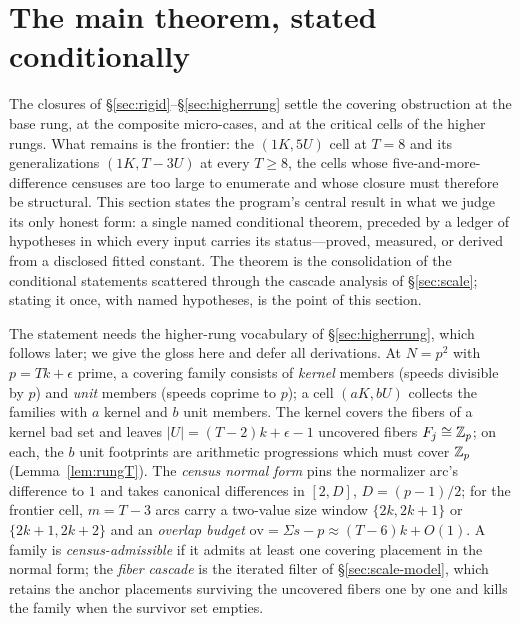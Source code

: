 
\section{The main theorem, stated conditionally}\label{sec:SC}

The closures of \S\ref{sec:rigid}--\S\ref{sec:higherrung} settle the
covering obstruction at the base rung, at the composite micro-cases, and
at the critical cells of the higher rungs. What remains is the frontier:
the $(1K,5U)$ cell at $T=8$ and its generalizations $(1K,T{-}3U)$ at
every $T\ge 8$, the cells whose five-and-more-difference censuses are too
large to enumerate and whose closure must therefore be structural. This
section states the program's central result in what we judge its only
honest form: a single named conditional theorem, preceded by a ledger of
hypotheses in which every input carries its status---proved, measured,
or derived from a disclosed fitted constant. The theorem is the
consolidation of the conditional statements scattered through the
cascade analysis of \S\ref{sec:scale}; stating it once, with named
hypotheses, is the point of this section.

The statement needs the higher-rung vocabulary of
\S\ref{sec:higherrung}, which follows later; we give the gloss here and
defer all derivations. At $N=p^2$ with $p=Tk+\epsilon$ prime, a covering
family consists of \emph{kernel} members (speeds divisible by $p$) and
\emph{unit} members (speeds coprime to $p$); a cell $(aK,bU)$ collects
the families with $a$ kernel and $b$ unit members. The kernel covers the
fibers of a kernel bad set and leaves $|U|=(T-2)k+\epsilon-1$ uncovered
fibers $F_j\cong\mathbb{Z}_p$; on each, the $b$ unit footprints are arithmetic
progressions which must cover $\mathbb{Z}_p$ (Lemma~\ref{lem:rungT}). The
\emph{census normal form} pins the normalizer arc's difference to $1$
and takes canonical differences in $[2,D]$, $D=(p-1)/2$; for the
frontier cell, $m=T-3$ arcs carry a two-value size window
$\{2k,2k+1\}$ or $\{2k+1,2k+2\}$ and an \emph{overlap budget}
$\mathrm{ov}=\Sigma s-p\approx(T-6)k+O(1)$. A family is
\emph{census-admissible} if it admits at least one covering placement in
the normal form; the \emph{fiber cascade} is the iterated filter of
\S\ref{sec:scale-model}, which retains the anchor placements surviving
the uncovered fibers one by one and kills the family when the survivor
set empties.

